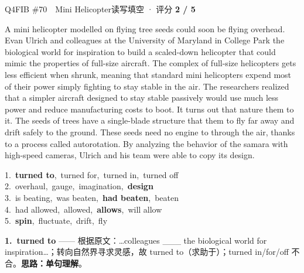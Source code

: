 \begin{qblock}{Q4\quad FIB \#70\ \ Mini Helicopter}{读写填空 · 评分 \textcolor{cAccent}{\bfseries 2 / 5}}
\begin{promptbox}
A mini helicopter modelled on flying tree seeds could soon be flying overhead. Evan Ulrich and colleagues at the University of Maryland in College Park  the biological world for inspiration to build a scaled-down helicopter that could mimic the properties of full-size aircraft. The complex  of full-size helicopters gets less efficient when shrunk, meaning that standard mini helicopters expend most of their power simply fighting to stay stable in the air. The researchers realized that a simpler aircraft designed to stay stable passively would use much less power and reduce manufacturing costs to boot. It turns out that nature  them to it. The seeds of trees have a single-blade structure that  them to fly far away and drift safely to the ground. These seeds need no engine to  through the air, thanks to a process called autorotation. By analyzing the behavior of the samara with high-speed cameras, Ulrich and his team were able to copy its design.
\end{promptbox}
{\small
1.\ \textbf{turned to},\ turned for,\ turned in,\ turned off\\
2.\ overhaul,\ gauge,\ imagination,\ \textbf{design}\\
3.\ is beating,\ was beaten,\ \textbf{had beaten},\ beaten\\
4.\ had allowed,\ allowed,\ \textbf{allows},\ will allow\\
5.\ \textbf{spin},\ fluctuate,\ drift,\ fly}
\begin{notebox}\footnotesize
\textbf{1.\ turned to} —— 根据原文：…colleagues \_\_\_ the biological world for inspiration…；转向自然界寻求灵感，故 turned to（求助于）；turned in/for/off 不合。\textbf{思路：单句理解}。\\[2pt]

\end{notebox}
\end{qblock}
